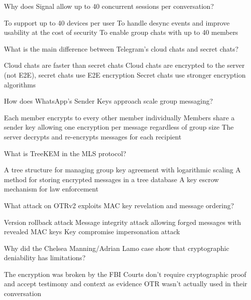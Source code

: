 \documentclass[10pt,a4paper,american]{exam}
\begin{document}
\begin{questions}
	\question Why does Signal allow up to 40 concurrent sessions per conversation?
	\begin{randomizechoices}
		\choice To support up to 40 devices per user
		\CorrectChoice To handle desync events and improve usability at the cost of security
		\choice To enable group chats with up to 40 members
	\end{randomizechoices}

	\question What is the main difference between Telegram's cloud chats and secret chats?
	\begin{randomizechoices}
		\choice Cloud chats are faster than secret chats
		\CorrectChoice Cloud chats are encrypted to the server (not E2E), secret chats use E2E encryption
		\choice Secret chats use stronger encryption algorithms
	\end{randomizechoices}

	\question How does WhatsApp's Sender Keys approach scale group messaging?
	\begin{randomizechoices}
		\choice Each member encrypts to every other member individually
		\CorrectChoice Members share a sender key allowing one encryption per message regardless of group size
		\choice The server decrypts and re-encrypts messages for each recipient
	\end{randomizechoices}

	\question What is TreeKEM in the MLS protocol?
	\begin{randomizechoices}
		\CorrectChoice A tree structure for managing group key agreement with logarithmic scaling
		\choice A method for storing encrypted messages in a tree database
		\choice A key escrow mechanism for law enforcement
	\end{randomizechoices}

	\question What attack on OTRv2 exploits MAC key revelation and message ordering?
	\begin{randomizechoices}
		\choice Version rollback attack
		\CorrectChoice Message integrity attack allowing forged messages with revealed MAC keys
		\choice Key compromise impersonation attack
	\end{randomizechoices}

	\question Why did the Chelsea Manning/Adrian Lamo case show that cryptographic deniability has limitations?
	\begin{randomizechoices}
		\choice The encryption was broken by the FBI
		\CorrectChoice Courts don't require cryptographic proof and accept testimony and context as evidence
		\choice OTR wasn't actually used in their conversation
	\end{randomizechoices}


\end{questions}
\end{document}
